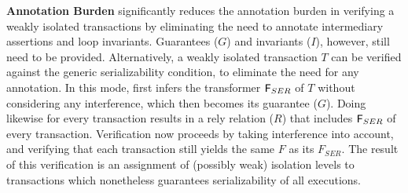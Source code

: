 \textbf{Annotation Burden} \tool significantly reduces the annotation
burden in verifying a weakly isolated transactions by eliminating the
need to annotate intermediary assertions and loop invariants.
Guarantees ($G$) and invariants ($I$), however, still need to be
provided. Alternatively, a weakly isolated transaction $T$ can be
verified against the generic serializability condition, to eliminate
the need for any annotation. In this mode, \tool first infers the
transformer ${\sf F}_{SER}$ of $T$ without considering any interference,
which then becomes its guarantee ($G$). Doing likewise for every
transaction results in a rely relation ($R$) that includes ${\sf F}_{SER}$
of every transaction. Verification now proceeds by taking interference
into account, and verifying that each transaction still yields the
same $F$ as its $F_{SER}$. The result of this verification is an
assignment of (possibly weak) isolation levels to transactions which
nonetheless guarantees serializability of all executions.  



